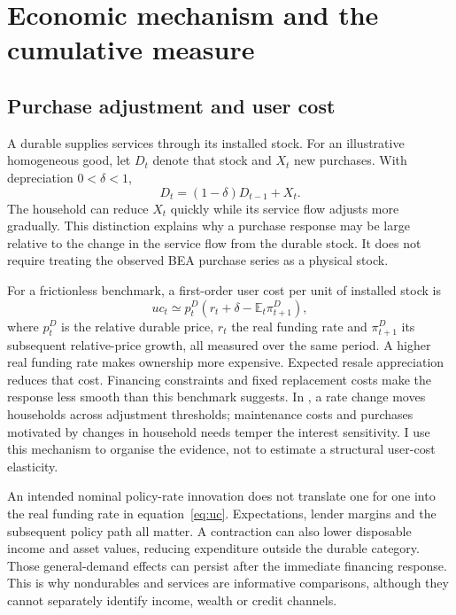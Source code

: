 \documentclass[11pt,a4paper]{article}
\newcommand{\E}{\mathbb{E}}
\begin{document}
\section{Economic mechanism and the cumulative measure}

\subsection{Purchase adjustment and user cost}

A durable supplies services through its installed stock. For an illustrative homogeneous good, let $D_t$ denote that stock and $X_t$ new purchases. With depreciation $0<\delta<1$,
\begin{equation}
 D_t=(1-\delta)D_{t-1}+X_t.\label{eq:stock}
\end{equation}
The household can reduce $X_t$ quickly while its service flow adjusts more gradually. This distinction explains why a purchase response may be large relative to the change in the service flow from the durable stock. It does not require treating the observed BEA purchase series as a physical stock.

For a frictionless benchmark, a first-order user cost per unit of installed stock is
\begin{equation}
 uc_t\simeq p_t^D\left(r_t+\delta-\E_t\pi^D_{t+1}\right),\label{eq:uc}
\end{equation}
where $p_t^D$ is the relative durable price, $r_t$ the real funding rate and $\pi^D_{t+1}$ its subsequent relative-price growth, all measured over the same period. A higher real funding rate makes ownership more expensive. Expected resale appreciation reduces that cost. Financing constraints and fixed replacement costs make the response less smooth than this benchmark suggests. In \citet{McKayWieland2021}, a rate change moves households across adjustment thresholds; maintenance costs and purchases motivated by changes in household needs temper the interest sensitivity. I use this mechanism to organise the evidence, not to estimate a structural user-cost elasticity.

An intended nominal policy-rate innovation does not translate one for one into the real funding rate in equation~\eqref{eq:uc}. Expectations, lender margins and the subsequent policy path all matter. A contraction can also lower disposable income and asset values, reducing expenditure outside the durable category. Those general-demand effects can persist after the immediate financing response. This is why nondurables and services are informative comparisons, although they cannot separately identify income, wealth or credit channels.
\end{document}
